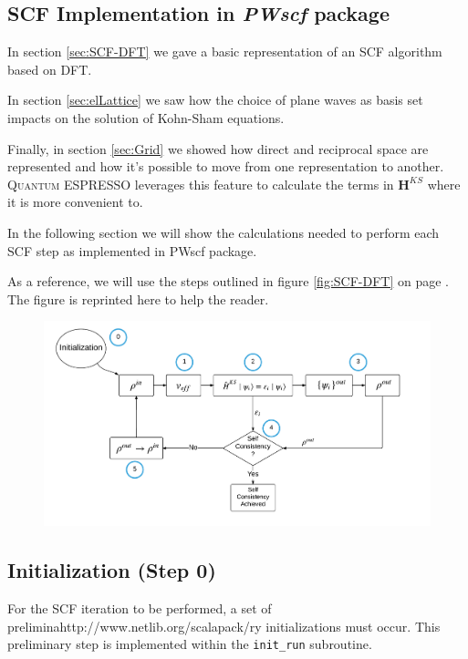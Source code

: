 \documentclass[a4paper,12pt]{article}
\newcommand\mf[1]{\mathbf{#1}}
\newcommand\QE{\textsc{Quantum} ESPRESSO }
\begin{document}
\subsection{SCF Implementation in \textit{PWscf} package}
In section \ref{sec:SCF-DFT} we gave a basic representation of an SCF algorithm based on DFT.

In section \ref{sec:elLattice} we saw how the choice of plane waves as basis set impacts on the solution of Kohn-Sham equations.

Finally, in section \ref{sec:Grid} we showed how direct and reciprocal space are represented and how it's possible to move from one representation to another. 
\QE leverages this feature to calculate the terms in $\mf{H}^{KS}$ where it is more convenient to.


In the following section we will show the calculations needed to perform each SCF step as implemented in PWscf package.

As a reference, we will use  the steps outlined in figure \ref{fig:SCF-DFT} on page \pageref{fig:SCF-DFT}.
The figure is reprinted here to help the reader.

\begin{figure}[h]
\begin{center}
	\includegraphics[width=\linewidth]{SCF-DFT_schema.pdf}	
	\end{center}
\end{figure}

\subsection{Initialization (Step 0)}
For the SCF iteration to be performed, a set of preliminahttp://www.netlib.org/scalapack/ry initializations must occur.
This preliminary step is implemented within the \texttt{init\_run} subroutine.
\end{document}
